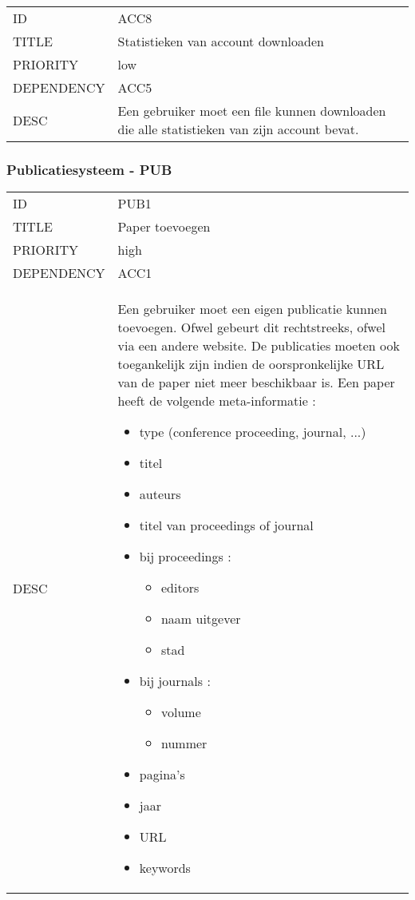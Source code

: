 \begin{longtable}{lp{10cm}}
ID           & ACC8\\
TITLE        & Statistieken van account downloaden\\
PRIORITY     & low\\
DEPENDENCY   & ACC5\\
DESC         & Een gebruiker moet een file kunnen downloaden die alle statistieken van zijn account bevat.     
\end{longtable}

\subsubsection{Publicatiesysteem - PUB}

\begin{longtable}{lp{10cm}}
ID           & PUB1\\
TITLE        & Paper toevoegen\\
PRIORITY     & high\\
DEPENDENCY   & ACC1\\
DESC         & Een gebruiker moet een eigen publicatie kunnen toevoegen. Ofwel gebeurt dit rechtstreeks, ofwel via een andere website. De publicaties moeten ook toegankelijk zijn indien de oorspronkelijke URL van de paper niet meer beschikbaar is.
Een paper heeft de volgende meta-informatie :
\begin{itemize}
\item type (conference proceeding, journal, ...)
\item titel
\item auteurs
\item titel van proceedings of journal
\item bij proceedings :
    \begin{itemize}
    \item editors
    \item naam uitgever
    \item stad
    \end{itemize}
\item bij journals :
    \begin{itemize}
    \item volume
    \item nummer
    \end{itemize}
\item pagina's
\item jaar
\item URL
\item keywords
\end{itemize}      
\end{longtable}

